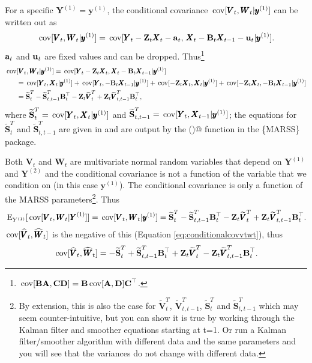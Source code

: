 \documentclass[]{article}
\def\UPS{\mbox{\boldmath $\Upsilon$}}
\def\XI{\mbox{\boldmath $\Xi$}}
\def\BB{\mbox{$\mathbf B$}}	\def\bb{\mbox{$\mathbf b$}} \def\Bb{\mbox{$\mathbf J$}} \def\Ba{\mbox{$\mathbf L$}} \def\Bm{\UPS}
\def\CC{\mbox{$\mathbf C$}}	\def\cc{\mbox{$\mathbf c$}}
\def\E{\,\textup{\textrm{E}}}
\def\Ss{\mbox{$\mathbf S$}}
\def\VV{\mbox{$\pmb{V}$}}	\def\vv{\mbox{$\pmb{v}$}}
\def\WW{\mbox{$\pmb{W}$}}	\def\ww{\mbox{$\pmb{w}$}}
\def\XX{\mbox{$\pmb{X}$}}	\def\xx{\mbox{$\pmb{x}$}}
\def\YY{\mbox{$\pmb{Y}$}}	\def\yy{\mbox{$\pmb{y}$}}
\def\ZZ{\mbox{$\mathbf Z$}}	\def\zz{\mbox{$\mathbf z$}}	\def\Zb{\mbox{$\mathbf M$}} \def\Za{\mbox{$\mathbf N$}} \def\Zm{\XI}
\def\cov{\,\textup{\textrm{cov}}}
\def\hatWt{\widehat{\WW}_t}
\def\hatVt{\widehat{\VV}_t}
\def\hatVtT{\widetilde{\VV}_t^T}
\def\hatVttmT{\widetilde{\VV}_{t,t-1}^T}
\def\hatStT{\widetilde{\Ss}_t^T}
\def\hatSttmT{\widetilde{\Ss}_{t,t-1}^T}
\begin{document}
For a specific $\YY^{(1)}=\yy^{(1)}$, the conditional covariance $\cov[\VV_t, \WW_t|\yy^{(1)}]$ can be written out as
\begin{equation}
\cov[\VV_t, \WW_t|\yy^{(1)}] = \cov[\YY_t-\ZZ_t\XX_t-\aa_t,\, \XX_t-\BB_t\XX_{t-1}-\uu_t|\yy^{(1)}] .
\end{equation}
$\aa_t$ and $\uu_t$ are fixed values and can be dropped. Thus\footnote{$\cov[\BB \mathbf{A},\CC \mathbf{D}]=\BB\cov[\mathbf{A},\mathbf{D}]\CC^\top$.}
\begin{equation}
\begin{split}
\cov&[\VV_t, \WW_t|\yy^{(1)}] =\cov[\YY_t-\ZZ_t\XX_t, \XX_t-\BB_t\XX_{t-1}|\yy^{(1)}] \\
& =\cov[\YY_t,\XX_t|\yy^{(1)}] + \cov[\YY_t,-\BB_t\XX_{t-1}|\yy^{(1)}] + \cov[-\ZZ_t\XX_t,\XX_t|\yy^{(1)}] + \cov[-\ZZ_t\XX_t,-\BB_t\XX_{t-1}|\yy^{(1)}]\\
& = \hatStT - \hatSttmT\BB_t^\top - \ZZ_t \hatVtT + \ZZ_t\hatVttmT\BB_t^\top ,
\end{split}
\end{equation}
where $\hatStT=\cov[\YY_t,\XX_t|\yy^{(1)}]$ and $\hatSttmT=\cov[\YY_t,\XX_{t-1}|\yy^{(1)}]$; the equations for $\hatStT$ and $\hatSttmT$ are given in \citet{Holmes2010} and are output by the \verb@MARSShatyt()@ function in the \{MARSS\} package.

Both $\VV_t$ and $\WW_t$ are multivariate normal random variables that depend on $\YY^{(1)}$ and $\YY^{(2)}$ and the conditional covariance is not a function of the variable that we condition on (in this case $\yy^{(1)}$). The conditional covariance is only a function of the MARSS parameters\footnote{By extension, this is also the case for $\hatVtT$, $\hatVttmT$, $\hatStT$ and $\hatSttmT$ which may seem counter-intuitive, but you can show it is true by working through the Kalman filter and smoother equations starting at t=1. Or run a Kalman filter/smoother algorithm with different data and the same parameters and you will see that the variances do not change with different data.}. Thus 
\begin{equation}
\E_{Y^{(1)}}[ \cov[\VV_t, \WW_t|\YY^{(1)}] ]= \cov[\VV_t, \WW_t|\yy^{(1)}] = \hatStT - \hatSttmT\BB_t^\top - \ZZ_t \hatVtT + \ZZ_t\hatVttmT\BB_t^\top .
\end{equation}
$\cov[\hatVt,\hatWt]$ is the negative of this (Equation \ref{eq:conditionalcovvtwt}), thus
\begin{equation}
\cov[\hatVt,\hatWt] = - \hatStT + \hatSttmT\BB_t^\top + \ZZ_t \hatVtT - \ZZ_t\hatVttmT\BB_t^\top .
\end{equation}
\end{document}
